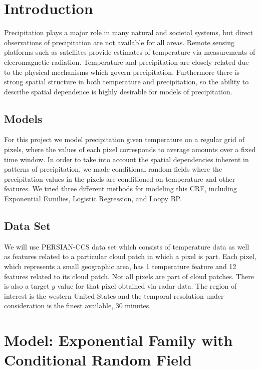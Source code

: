 
\section{Introduction}
Precipitation plays a major role in many natural and societal systems, but direct observations of precipitation are not available for all areas. Remote sensing platforms such as satellites provide estimates of temperature via measurements of elecromagnetic radiation. Temperature and precipitation are closely related due to the physical mechanisms which govern precipitation. Furthermore there is strong spatial structure in both temperature and precipitation, so the ability to describe spatial dependence is highly desirable for models of precipitation. 

\subsection{Models}

For this project we model precipitation given temperature on a regular grid of pixels, where the values of each pixel corresponds to average amounts over a fixed time window. In order to take into account the spatial dependencies inherent in patterns of precipitation, we made conditional random fields where the precipitation values in the pixels are conditioned on temperature and other features. We tried three different methods for modeling this CRF, including Exponential Families, Logistic Regression, and Loopy BP. 

\subsection{Data Set}
We will use PERSIAN-CCS data set \cite{persianccs} which consists of temperature data as well as features related to a particular cloud patch in which a pixel is part. Each pixel, which represents a small geographic area, has 1 temperature feature and 12 features related to its cloud patch. Not all pixels are part of cloud patches. There is also a target $y$ value for that pixel obtained via radar data. The region of interest is the western United States and the temporal resolution under consideration is the finest available, 30 minutes. 

\section{Model: Exponential Family with Conditional Random Field}

